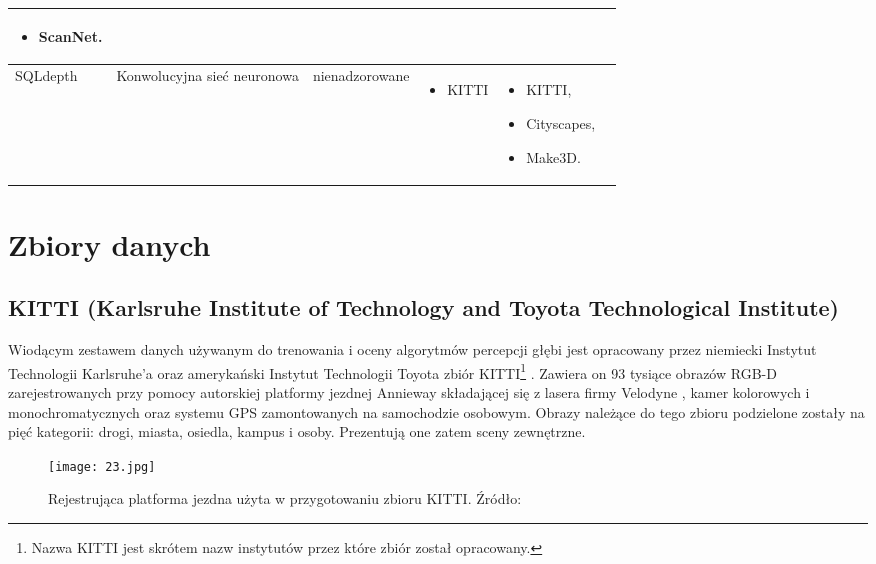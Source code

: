 \begin{table}[H]
{\begin{tabular}{ |l|p{2cm}|p{3cm}|p{5cm}|p{5cm}|r| }
\begin{itemize}
            \item ScanNet.
        \end{itemize}\\
        \hline
        SQLdepth &
        Konwolucyjna sieć neuronowa &
        nienadzorowane &
        \begin{itemize}
            \item KITTI
        \end{itemize} & 
        \begin{itemize}
            \item KITTI,
            \item Cityscapes,
            \item Make3D.
        \end{itemize}\\
        \hline
        \end{tabular}%
    }
    \label{tabela_podsumowanie_algorytmy_2}
\end{table}

\section{Zbiory danych}
\subsection{KITTI (Karlsruhe Institute of Technology and Toyota Technological Institute)}
Wiodącym zestawem danych używanym do trenowania i oceny algorytmów percepcji głębi jest opracowany przez niemiecki Instytut Technologii Karlsruhe'a oraz amerykański Instytut Technologii Toyota zbiór KITTI\footnote{Nazwa KITTI jest skrótem nazw instytutów przez które zbiór został opracowany.} \cite{geiger2012}. Zawiera on 93 tysiące obrazów RGB-D zarejestrowanych przy pomocy autorskiej platformy jezdnej Annieway składającej się z lasera firmy Velodyne \cite{Velodyne}, kamer kolorowych i monochromatycznych oraz systemu GPS zamontowanych na samochodzie osobowym. Obrazy należące do tego zbioru podzielone zostały na pięć kategorii: drogi, miasta, osiedla, kampus i osoby. Prezentują one zatem sceny zewnętrzne.
\begin{figure}[H]
    \centering
    \texttt{[image: 23.jpg]}
    \caption{Rejestrująca platforma jezdna użyta w przygotowaniu zbioru KITTI. Źródło: \cite{geiger2012}}
    \label{fig:kitti-annieway}
\end{figure}
